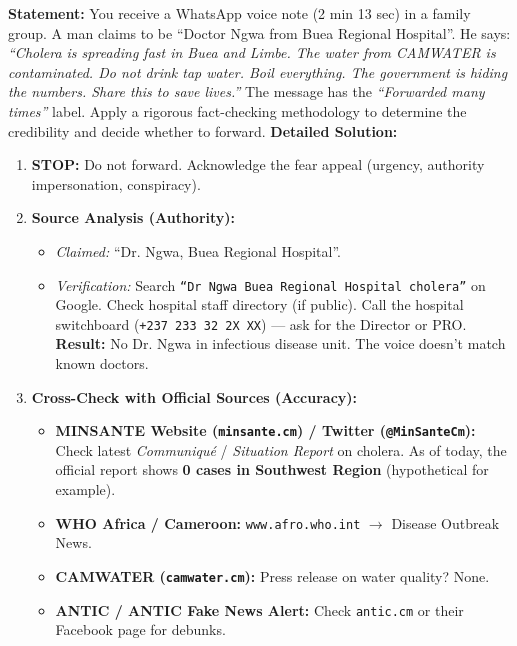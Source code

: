 \documentclass[11pt]{article}
\begin{document}
\begin{exoresolu}
    \textbf{Statement:} You receive a WhatsApp voice note (2 min 13 sec) in a family group. A man claims to be ``Doctor Ngwa from Buea Regional Hospital''. He says: \textit{``Cholera is spreading fast in Buea and Limbe. The water from CAMWATER is contaminated. Do not drink tap water. Boil everything. The government is hiding the numbers. Share this to save lives.''} The message has the \textit{``Forwarded many times''} label. Apply a rigorous fact-checking methodology to determine the credibility and decide whether to forward.
    \tcblower
    \textbf{Detailed Solution:}
    \begin{enumerate}
        \item \textbf{STOP:} Do not forward. Acknowledge the fear appeal (urgency, authority impersonation, conspiracy).
        \item \textbf{Source Analysis (Authority):}
              \begin{itemize}
                  \item \textit{Claimed:} ``Dr. Ngwa, Buea Regional Hospital''.
                  \item \textit{Verification:} Search \texttt{``Dr Ngwa Buea Regional Hospital cholera''} on Google. Check hospital staff directory (if public). Call the hospital switchboard (\texttt{+237 233 32 2X XX}) — ask for the Director or PRO. \textbf{Result:} No Dr. Ngwa in infectious disease unit. The voice doesn't match known doctors.
              \end{itemize}
        \item \textbf{Cross-Check with Official Sources (Accuracy):}
              \begin{itemize}
                  \item \textbf{MINSANTE Website (\texttt{minsante.cm}) / Twitter (\texttt{@MinSanteCm}):} Check latest \textit{Communiqué} / \textit{Situation Report} on cholera. As of today, the official report shows \textbf{0 cases in Southwest Region} (hypothetical for example).
                  \item \textbf{WHO Africa / Cameroon:} \texttt{www.afro.who.int} $\rightarrow$ Disease Outbreak News.
                  \item \textbf{CAMWATER (\texttt{camwater.cm}):} Press release on water quality? None.
                  \item \textbf{ANTIC / ANTIC Fake News Alert:} Check \texttt{antic.cm} or their Facebook page for debunks.

\end{itemize}
\end{enumerate}
\end{exoresolu}
\end{document}
